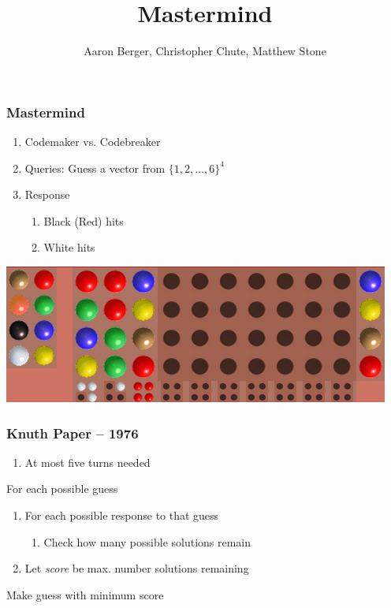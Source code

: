 \documentclass{beamer}
\title{Mastermind}
\author{Aaron Berger, Christopher Chute, Matthew Stone}
\begin{document}
    \begin{frame}
    	\maketitle
    \end{frame}

    \begin{frame}
    	\frametitle{Mastermind}
	   	\begin{enumerate}[label=\roman*.]
	    \item Codemaker vs. Codebreaker
	    \item Queries: Guess a vector from $\{1,2,\ldots,6\}^4$
	    \item Response
	    	\begin{enumerate}[label=\roman*.]
			\item Black (Red) hits
			\item White hits
			\end{enumerate}
   	    \end{enumerate}
	    \begin{center}
	    \includegraphics[width=.65\textwidth, keepaspectratio=true]{mm.png}
	    \end{center}
    \end{frame}

    \begin{frame}
    	\frametitle{Knuth Paper -- 1976}
    	\begin{enumerate}[label=\roman*.]
		\item At most five turns needed
		\end{enumerate}
		\begin{tcolorbox}[colback=green!5,colframe=green!40!black,title=Minimax]
		For each possible guess
			\begin{enumerate}[label=]
			\item For each possible response to that guess
				\begin{enumerate}[label=]
				\item Check how many possible solutions remain
				\end{enumerate}
			\item Let \textit{score} be max. number solutions remaining
			\end{enumerate}
		Make guess with minimum score
		\end{tcolorbox}
    \end{frame}
 
\end{document}
